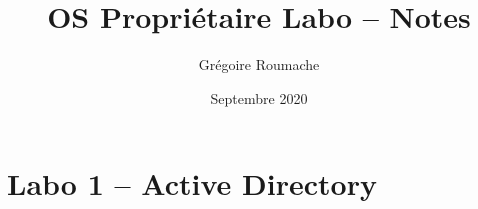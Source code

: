\documentclass[a4paper]{article}
\title{OS Propriétaire Labo -- Notes}
\author{Grégoire Roumache}
\date{Septembre 2020}
\begin{document}
\maketitle

\tableofcontents















\section{Labo 1 -- Active Directory}







\end{document}
